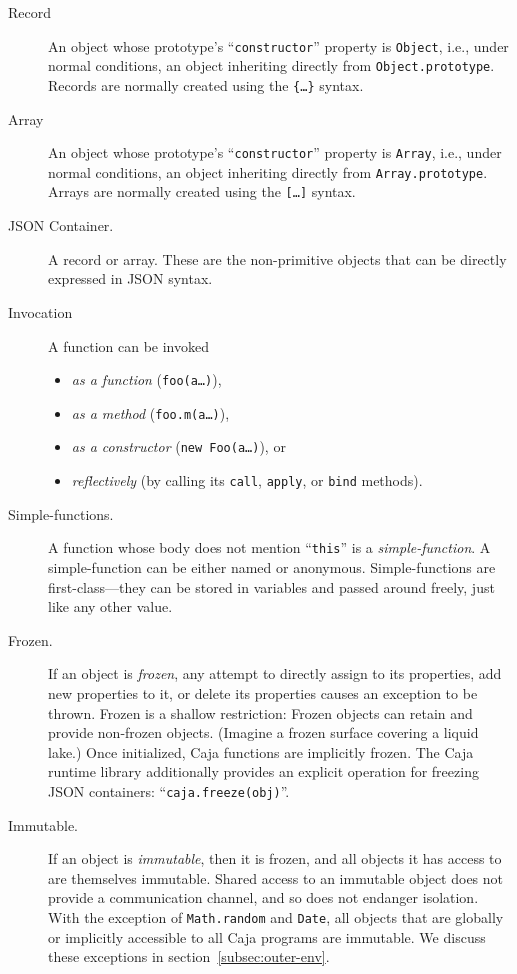 \documentclass[letterpaper,twocolumn,10pt]{article}
\newcommand{\code}[1]{{\tt {#1}}}              %
\begin{document}
\begin{description}

  \item[Record] An object whose prototype's ``\code{constructor}'' property is \code{Object}, i.e., under normal 
  conditions, an object inheriting directly from \code{Object.prototype}. Records are normally created using the 
  \code{\{\ldots\}} syntax.

  \item[Array] An object whose prototype's ``\code{constructor}'' property is \code{Array}, i.e., under normal 
  conditions, an object inheriting directly from \code{Array.prototype}. Arrays are normally created using the 
  \code{[\ldots]} syntax.

  \item[JSON Container.] A record or array. These are the non-primitive objects that can be directly expressed in 
  JSON syntax.
  
  \item[Invocation] A function can be invoked
  \begin{itemize}
    \item \emph{as a function} (\code{foo(a\ldots)}),
    \item \emph{as a method} (\code{foo.m(a\ldots)}),
    \item \emph{as a constructor} (\code{new Foo(a\ldots)}), or
    \item \emph{reflectively} (by calling its \code{call}, \code{apply}, or \code{bind} methods).
  \end{itemize}

  \item[Simple-functions.] A function whose body does not mention ``\code{this}'' is a \emph{simple-function}. A 
  simple-function can be either named or anonymous. Simple-functions are first-class---they can be stored in 
  variables and passed around freely, just like any other value.
  
  \item[Frozen.] If an object is \emph{frozen}, any attempt to directly assign to its properties, add new properties 
  to it, or delete its properties causes an exception to be thrown. Frozen is a shallow restriction: Frozen objects 
  can retain and provide non-frozen objects. (Imagine a frozen surface covering a liquid lake.) Once initialized, 
  Caja functions are implicitly frozen. The Caja runtime library additionally provides an explicit operation for 
  freezing JSON containers: ``\code{caja.freeze(obj)}''.
  
  \item[Immutable.] If an object is \emph{immutable}, then it is frozen, and all objects it has access to are 
  themselves immutable. Shared access to an immutable object does not provide a communication channel, and so does 
  not endanger isolation. With the exception of \code{Math.random} and \code{Date}, all objects that are globally or 
  implicitly accessible to all Caja programs are immutable. We discuss these exceptions in 
  section~\ref{subsec:outer-env}.

\end{description}
\end{document}

